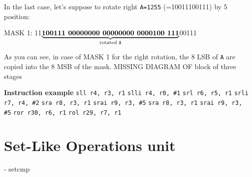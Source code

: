 In the last case, let's suppose to rotate right \texttt{A=1255} (=10011100111) by 5 position:
\begin{center}
	MASK 1: 11$\underbrace{\textbf{100111 00000000 00000000 0000100 111}}_{\text{rotated \texttt{A}}}$00111
\end{center}
As you can see, in case of MASK 1 for the right rotation, the 8 LSB of \texttt{A} are copied into the 8 MSB of the mask.\newline
MISSING DIAGRAM OF block of three stages

\begin{mybox}
	\textbf{Instruction example}
	\newline
	\texttt{sll r4, r3, r1}
	\newline
	\texttt{slli r4, r0, \#1}
	\newline
	\texttt{srl r6, r5, r1}
	\newline
	\texttt{srli r7, r4, \#2}
	\newline
	\texttt{sra r8, r3, r1}
	\newline
	\texttt{srai r9, r3, \#5}
	\newline
	\texttt{sra r8, r3, r1}
	\newline
	\texttt{srai r9, r3, \#5}
	\newline
	\texttt{ror r30, r6, r1}
	\newline
	\texttt{rol r29, r7, r1}
\end{mybox}
\section{Set-Like Operations unit}
- setcmp